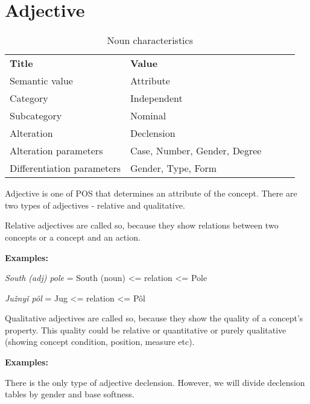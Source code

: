 \section{Adjective}

\begin{table}[h]
	\caption{Noun characteristics}
	\begin{tabular}{lllll}
		\textbf{Title}              & \textbf{Value}               \\
		Semantic value              & Attribute                    \\
		Category                    & Independent                  \\
		Subcategory                 & Nominal                      \\
		Alteration                  & Declension                   \\
		Alteration parameters       & Case, Number, Gender, Degree \\
		Differentiation parameters  & Gender, Type, Form
	\end{tabular}
\end{table}

Adjective is one of POS that determines an attribute of the concept. There are two types of adjectives - relative and qualitative. 

Relative adjectives are called so, because they show relations between two concepts or a concept and an action.

\textbf{Examples:}

\textit{South (adj) pole} = South (noun) <= relation <= Pole

\textit{Južnyǐ pôl} = Jug <= relation <= Pôl

Qualitative adjectives are called so, because they show the quality of a concept’s property. This quality could be relative or quantitative or purely qualitative (showing concept condition, position, measure etc).

\textbf{Examples:}

There is the only type of adjective declension. However, we will divide declension tables by gender and base softness.
